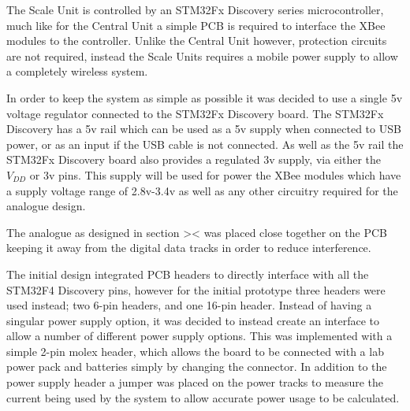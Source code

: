 The Scale Unit is controlled by an STM32Fx Discovery series microcontroller, much like for the Central Unit a simple PCB is required to interface the XBee modules to the controller.  Unlike the Central Unit however, protection circuits are not required, instead the Scale Units requires a mobile power supply to allow a completely wireless system.

In order to keep the system as simple as possible it was decided to use a single 5v voltage regulator connected to the STM32Fx Discovery board. The STM32Fx Discovery has a 5v rail which can be used as a 5v supply when connected to USB power, or as an input if the USB cable is not connected. As well as the 5v rail the STM32Fx Discovery board also provides a regulated 3v supply, via either the $V_{DD}$ or 3v pins. This supply will be used for power the XBee modules which have a supply voltage range of 2.8v-3.4v as well as any other circuitry required for the analogue design.

The analogue as designed in section >< was placed close together on the PCB keeping it away from the digital data tracks in order to reduce interference.

The initial design integrated PCB headers to directly interface with all the STM32F4 Discovery pins, however for the initial prototype three headers were used instead; two 6-pin headers, and one 16-pin header. Instead of having a singular power supply option, it was decided to instead create an interface to allow a number of different power supply options. This was implemented with a simple 2-pin molex header, which allows the board to be connected with a lab power pack and batteries simply by changing the connector. In addition to the power supply header a jumper was placed on the power tracks to measure the current being used by the system to allow accurate power usage to be calculated.

